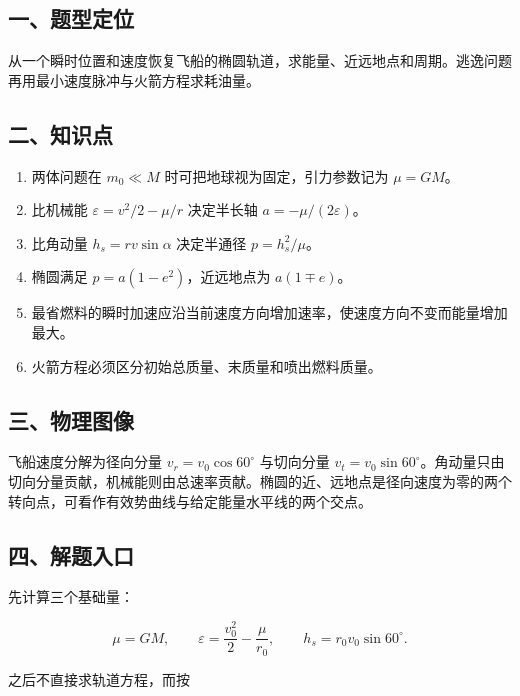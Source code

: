 \documentclass[12pt,a4paper,UTF8]{ctexart}
\newcommand{\tightlist}{\setlength{\itemsep}{0pt}\setlength{\parskip}{0pt}}
\begin{document}
\subsection{一、题型定位}\label{ux4e00ux9898ux578bux5b9aux4f4d-1}

从一个瞬时位置和速度恢复飞船的椭圆轨道，求能量、近远地点和周期。逃逸问题再用最小速度脉冲与火箭方程求耗油量。

\subsection{二、知识点}\label{ux4e8cux77e5ux8bc6ux70b9-1}

\begin{enumerate}
\def\labelenumi{\arabic{enumi}.}
\tightlist
\item
  两体问题在 \(m_0\ll M\) 时可把地球视为固定，引力参数记为 \(\mu=GM\)。
\item
  比机械能 \(\varepsilon=v^2/2-\mu/r\) 决定半长轴
  \(a=-\mu/(2\varepsilon)\)。
\item
  比角动量 \(h_s=rv\sin\alpha\) 决定半通径 \(p=h_s^2/\mu\)。
\item
  椭圆满足 \(p=a(1-e^2)\)，近远地点为 \(a(1\mp e)\)。
\item
  最省燃料的瞬时加速应沿当前速度方向增加速率，使速度方向不变而能量增加最大。
\item
  火箭方程必须区分初始总质量、末质量和喷出燃料质量。
\end{enumerate}

\subsection{三、物理图像}\label{ux4e09ux7269ux7406ux56feux50cf-1}

飞船速度分解为径向分量 \(v_r=v_0\cos60^\circ\) 与切向分量
\(v_t=v_0\sin60^\circ\)。角动量只由切向分量贡献，机械能则由总速率贡献。椭圆的近、远地点是径向速度为零的两个转向点，可看作有效势曲线与给定能量水平线的两个交点。

\subsection{四、解题入口}\label{ux56dbux89e3ux9898ux5165ux53e3-1}

先计算三个基础量：

\[\mu=GM,\qquad \varepsilon=\frac{v_0^2}{2}-\frac\mu{r_0},\qquad h_s=r_0v_0\sin60^\circ.\]

之后不直接求轨道方程，而按
\end{document}

